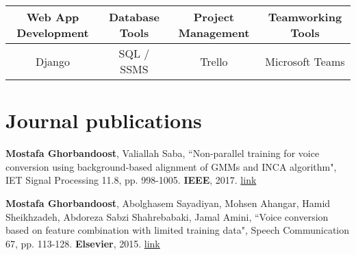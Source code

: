 \documentclass[letterpaper,11pt]{article}
\begin{document}
\vspace{-20pt}

\begin{table}[h!]
  \begin{center}
    \label{tab:table1}
    \begin{tabular}{c|c|c|c}
      Web App Development \hspace{5pt} & \hspace{5pt} Database Tools \hspace{5pt} & \hspace{5pt}Project Management \hspace{5pt} & \hspace{5pt} Teamworking Tools \hspace{5pt} \\
      \hline
      Django & SQL / SSMS &  Trello  & Microsoft Teams \\
    \end{tabular}
  \end{center}
\end{table}

\vspace{-20pt}

\section{Journal publications}
\begin{enumerate}[noitemsep, leftmargin=*,label={[\arabic*]}]
\item{\textbf{Mostafa Ghorbandoost}, Valiallah Saba, ``Non-parallel training for voice conversion using background-based alignment of GMMs and INCA algorithm", IET Signal Processing 11.8, pp. 998-1005. \textbf{IEEE}, 2017. \href{https://ieeexplore.ieee.org/document/8056552}{link}}
\vspace{5pt}
\item{\textbf{Mostafa Ghorbandoost}, Abolghasem Sayadiyan, Mohsen Ahangar, Hamid Sheikhzadeh, Abdoreza Sabzi Shahrebabaki, Jamal Amini, ``Voice conversion based on feature combination with limited training data", Speech Communication 67, pp. 113-128. \textbf{Elsevier}, 2015. \href{https://www.sciencedirect.com/science/article/abs/pii/S0167639314000892}{link}}
\end{enumerate}
\end{document}
